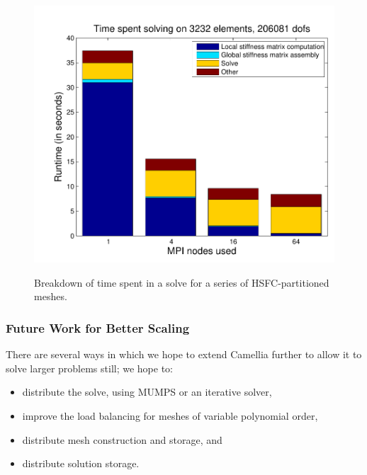 \begin{figure}[h!]
{\includegraphics[scale = 0.42]{figs/scalingFigs/bar_ref2.pdf}
}
\caption{Breakdown of time spent in a solve for a series of HSFC-partitioned meshes.}
\label{fig:timeBreakdown}
\end{figure}

\subsubsection{Future Work for Better Scaling}\label{sec:FutureWork}
There are several ways in which we hope to extend Camellia further to allow it to solve larger problems still; we hope to:
\begin{itemize}
\item distribute the solve, using MUMPS or an iterative solver,
\item improve the load balancing for meshes of variable polynomial order,
\item distribute mesh construction and storage, and
\item distribute solution storage.
\end{itemize}

